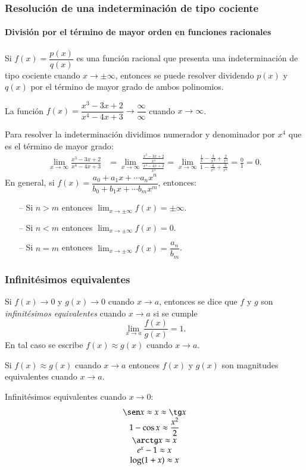 \begin{frame}
\frametitle{Resolución de una indeterminación de tipo cociente}
\framesubtitle{División por el término de mayor orden en funciones racionales}
Si $f(x)=\dfrac{p(x)}{q(x)}$ es una función racional que presenta una indeterminación de tipo cociente cuando $x\rightarrow \pm\infty$, entonces se puede resolver dividendo $p(x)$ y $q(x)$ por el término de mayor grado de ambos polinomios.

 La función $f(x)=\dfrac{x^3-3x+2}{x^4-4x+3}\rightarrow \dfrac{\infty}{\infty}$ cuando $x\rightarrow \infty$.

Para resolver la indeterminación dividimos numerador y denominador por $x^4$ que es el término de mayor grado:
\begin{align*}
\lim_{x\rightarrow \infty}\frac{x^3-3x+2}{x^4-4x+3} &=
\lim_{x\rightarrow \infty}\frac{\frac{x^3-3x+2}{x^4}}{\frac{x^4-4x+3}{x^4}} =
\lim_{x\rightarrow \infty}\frac{\frac{1}{x}-\frac{3}{x^3}+\frac{2}{x^4}}{1-\frac{4}{x^3}+\frac{3}{x^4}} =\frac{0}{1}=0.
\end{align*}
En general, si $f(x)=\dfrac{a_0+a_1x+\cdots a_nx^n}{b_0+b_1x+\cdots b_mx^m}$, entonces:
\begin{itemize}
\item[--] Si $n>m$ entonces $\lim_{x\rightarrow \pm \infty}f(x)=\pm\infty$.
\item[--] Si $n<m$ entonces $\lim_{x\rightarrow \pm \infty}f(x)=0$.
\item[--] Si $n=m$ entonces $\lim_{x\rightarrow \pm \infty}f(x)=\dfrac{a_n}{b_m}$.
\end{itemize}
\end{frame}


\begin{frame}
\frametitle{Infinitésimos equivalentes}
\begin{definicion}
Si $f(x)\rightarrow 0$ y $g(x)\rightarrow 0$ cuando $x\rightarrow a$, entonces se dice que $f$ y $g$ son \emph{infinitésimos equivalentes} cuando $x\rightarrow a$ si se cumple
\[
\lim_{x\rightarrow a}\frac{f(x)}{g(x)}=1.
\]
En tal caso se escribe $f(x)\approx g(x)$ cuando $x\rightarrow a$.
\end{definicion}

Si $f(x)\approx g(x)$ cuando $x\rightarrow a$ entonces $f(x)$ y $g(x)$ son magnitudes equivalentes cuando $x\rightarrow a$.

Infinitésimos equivalentes cuando $x\rightarrow 0$:
\[
\begin{array}{c}
\sen x \approx x \approx \tg x\\
1-\cos x \approx \dfrac{x^2}{2}\\
\arctg x \approx x\\
e^x-1 \approx x\\
\log(1+x) \approx x\\
\end{array}
\]
\end{frame}


